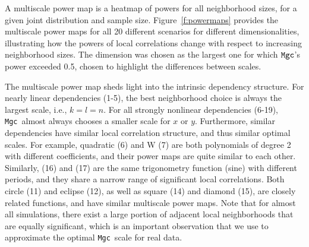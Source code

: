 \documentclass[11pt]{article}
\providecommand{\sct}[1]{{\sc \texttt{#1}}}
\newcommand{\Mgc}{\sct{Mgc}}
\begin{document}
A multiscale power map is a heatmap of powers for all neighborhood sizes, for a given joint distribution and sample size.
Figure~\ref{f:powermaps} provides the multiscale power maps for all 20 different scenarios for different dimensionalities, illustrating how the powers of local correlations change with respect to increasing neighborhood sizes.
The dimension was chosen as the largest one for which $\Mgc$'s power exceeded 0.5, chosen to highlight the differences between scales.

The multiscale power map sheds light into the intrinsic dependency structure.
For nearly linear dependencies (1-5), the best neighborhood choice is always the largest scale, i.e., $k=l=n$. For all strongly nonlinear dependencies (6-19), \Mgc~almost always chooses a smaller scale for $x$ or $y$.
 Furthermore, similar dependencies have similar local correlation structure, and thus similar optimal scales. For example, quadratic (6) and W (7) are both polynomials of degree 2 with different coefficients, and their power maps are quite similar to each other. Similarly,  (16) and (17) are the same trigonometry function (sine) with different periods, and they share a narrow range of significant local correlations.
Both circle (11) and eclipse (12), as well as square (14) and diamond (15), are closely related functions, and have similar multiscale power maps.
Note that for almost all simulations, there exist a large portion of adjacent local neighborhoods that are equally significant, which is an important observation that we use to approximate the optimal \Mgc~scale for real data.
\end{document}
